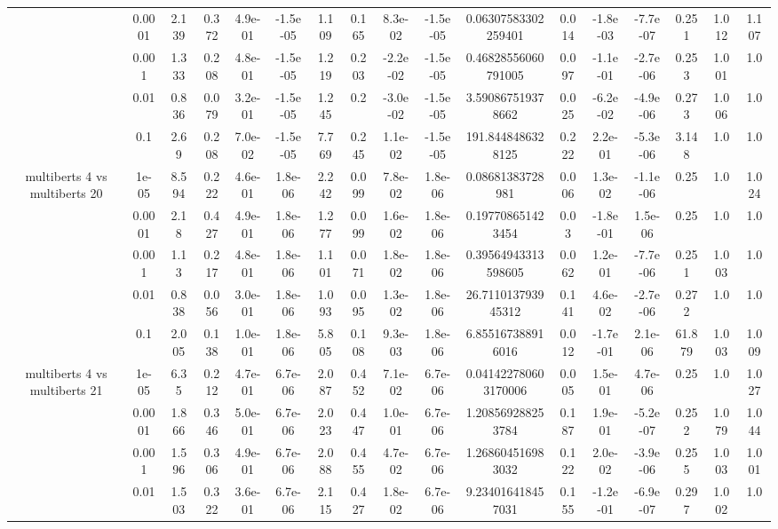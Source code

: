 \begin{tabular}{|c|c|c|c|c|c|c|c|c|c|c|c|c|c|c|c|c|}
 & 0.0001 & 2.139 & 0.372 & 4.9e-01 & -1.5e-05 & 1.109 & 0.165 & 8.3e-02 & -1.5e-05 & 0.06307583302259401 & 0.014 & -1.8e-03 & -7.7e-07 & 0.251 & 1.012 & 1.107 \\
 & 0.001 & 1.333 & 0.208 & 4.8e-01 & -1.5e-05 & 1.219 & 0.203 & -2.2e-02 & -1.5e-05 & 0.46828556060791005 & 0.097 & -1.1e-01 & -2.7e-06 & 0.253 & 1.001 & 1.0 \\
 & 0.01 & 0.836 & 0.079 & 3.2e-01 & -1.5e-05 & 1.245 & 0.2 & -3.0e-02 & -1.5e-05 & 3.590867519378662 & 0.025 & -6.2e-02 & -4.9e-06 & 0.273 & 1.006 & 1.0 \\
 & 0.1 & 2.69 & 0.208 & 7.0e-02 & -1.5e-05 & 7.769 & 0.245 & 1.1e-02 & -1.5e-05 & 191.8448486328125 & 0.222 & 2.2e-01 & -5.3e-06 & 3.148 & 1.0 & 1.0 \\
\hline
\multirow{5}{*}{multiberts 4 vs multiberts 20} & 1e-05 & 8.594 & 0.222 & 4.6e-01 & 1.8e-06 & 2.242 & 0.099 & 7.8e-02 & 1.8e-06 & 0.08681383728981 & 0.006 & 1.3e-02 & -1.1e-06 & 0.25 & 1.0 & 1.024 \\
 & 0.0001 & 2.18 & 0.427 & 4.9e-01 & 1.8e-06 & 1.277 & 0.099 & 1.6e-02 & 1.8e-06 & 0.197708651423454 & 0.03 & -1.8e-01 & 1.5e-06 & 0.25 & 1.0 & 1.0 \\
 & 0.001 & 1.13 & 0.217 & 4.8e-01 & 1.8e-06 & 1.101 & 0.071 & 1.8e-02 & 1.8e-06 & 0.39564943313598605 & 0.062 & 1.2e-01 & -7.7e-06 & 0.251 & 1.003 & 1.0 \\
 & 0.01 & 0.838 & 0.056 & 3.0e-01 & 1.8e-06 & 1.093 & 0.095 & 1.3e-02 & 1.8e-06 & 26.711013793945312 & 0.141 & 4.6e-02 & -2.7e-06 & 0.272 & 1.0 & 1.0 \\
 & 0.1 & 2.005 & 0.138 & 1.0e-01 & 1.8e-06 & 5.805 & 0.108 & 9.3e-03 & 1.8e-06 & 6.855167388916016 & 0.012 & -1.7e-01 & 2.1e-06 & 61.879 & 1.003 & 1.009 \\
\hline
\multirow{5}{*}{multiberts 4 vs multiberts 21} & 1e-05 & 6.35 & 0.212 & 4.7e-01 & 6.7e-06 & 2.087 & 0.452 & 7.1e-02 & 6.7e-06 & 0.041422780603170006 & 0.005 & 1.5e-01 & 4.7e-06 & 0.25 & 1.0 & 1.027 \\
 & 0.0001 & 1.866 & 0.346 & 5.0e-01 & 6.7e-06 & 2.023 & 0.447 & 1.0e-01 & 6.7e-06 & 1.208569288253784 & 0.187 & 1.9e-01 & -5.2e-07 & 0.252 & 1.079 & 1.044 \\
 & 0.001 & 1.596 & 0.306 & 4.9e-01 & 6.7e-06 & 2.088 & 0.455 & 4.7e-02 & 6.7e-06 & 1.268604516983032 & 0.122 & 2.0e-02 & -3.9e-06 & 0.255 & 1.003 & 1.001 \\
 & 0.01 & 1.503 & 0.322 & 3.6e-01 & 6.7e-06 & 2.115 & 0.427 & 1.8e-02 & 6.7e-06 & 9.234016418457031 & 0.155 & -1.2e-01 & -6.9e-07 & 0.297 & 1.002 & 1.0 \\

\end{tabular}

